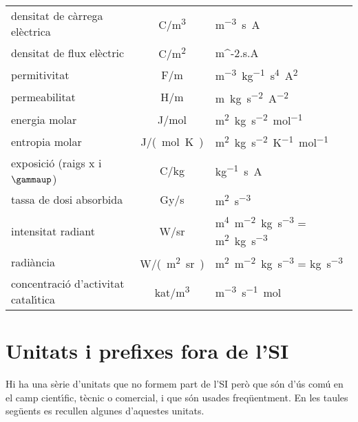 \begin{longtable}[h]{lcl}
   densitat de c\`{a}rrega el\`{e}ctrica & \si{C/m^3} & \si{m^{-3}.s.A} \\
   densitat de flux el\`{e}ctric & \si{C/m^2} & \si{m^{-2}.s.A }\\
   permitivitat &  \si{F/m}& \si{m^{-3}.kg^{-1}.s^4.A^2} \\
   permeabilitat &  \si{H/m} & \si{m.kg.s^{-2}.A^{-2}} \\
   energia molar & \si{J/mol} & \si{m^2.kg.s^{-2}.mol^{-1}} \\
   entropia molar& \si{J/(mol.K)} & \si{m^2.kg.s^{-2}.K^{-1}.mol^{-1}} \\
   exposici\'{o} (raigs x i $\gammaup$) & \si{C/kg} & \si{kg^{-1}.s.A} \\
   tassa de dosi absorbida & \si{Gy/s} & \si{m^2.s^{-3}}\\
   intensitat radiant & \si{W/sr} & \si{m^4.m^{-2}.kg.s^{-3}} = \si{m^2.kg.s^{-3}} \\
   radi\`{a}ncia & \si{W/(m^2.sr)} & \si{m^2.m^{-2}.kg.s^{-3}} = \si{kg.s^{-3}} \\
   concentraci\'{o} d'activitat catal\'{\i}tica &  \si{kat/m^3} & \si{m^{-3}.s^{-1}.mol}\\
    \bottomrule[1pt]
\end{longtable}



\section{Unitats i prefixes fora de l'SI}

Hi ha una s\`{e}rie d'unitats que no formem part de l'SI per\`{o} que s\'{o}n d'\'{u}s com\'{u} en el camp cient\'{\i}fic, t\`{e}cnic o comercial, i que s\'{o}n usades freq\"{u}entment. En les taules seg\"{u}ents es recullen algunes d'aquestes unitats.


